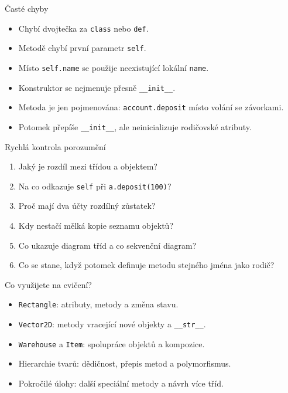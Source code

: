 \documentclass[aspectratio=169]{beamer}
\begin{document}
\begin{frame}{Časté chyby}
  \begin{itemize}
    \item Chybí dvojtečka za \texttt{class} nebo \texttt{def}.
    \item Metodě chybí první parametr \texttt{self}.
    \item Místo \texttt{self.name} se použije neexistující lokální \texttt{name}.
    \item Konstruktor se nejmenuje přesně \texttt{\_\_init\_\_}.
    \item Metoda je jen pojmenována: \texttt{account.deposit} místo volání se závorkami.
    \item Potomek přepíše \texttt{\_\_init\_\_}, ale neinicializuje rodičovské atributy.
  \end{itemize}
\end{frame}

\begin{frame}{Rychlá kontrola porozumění}
  \begin{enumerate}
    \item Jaký je rozdíl mezi třídou a objektem?
    \item Na co odkazuje \texttt{self} při \texttt{a.deposit(100)}?
    \item Proč mají dva účty rozdílný zůstatek?
    \item Kdy nestačí mělká kopie seznamu objektů?
    \item Co ukazuje diagram tříd a co sekvenční diagram?
    \item Co se stane, když potomek definuje metodu stejného jména jako rodič?
  \end{enumerate}
\end{frame}

\begin{frame}{Co využijete na cvičení?}
  \begin{itemize}
    \item \texttt{Rectangle}: atributy, metody a změna stavu.
    \item \texttt{Vector2D}: metody vracející nové objekty a \texttt{\_\_str\_\_}.
    \item \texttt{Warehouse} a \texttt{Item}: spolupráce objektů a kompozice.
    \item Hierarchie tvarů: dědičnost, přepis metod a polymorfismus.
    \item Pokročilé úlohy: další speciální metody a návrh více tříd.
  \end{itemize}
\end{frame}
\end{document}
